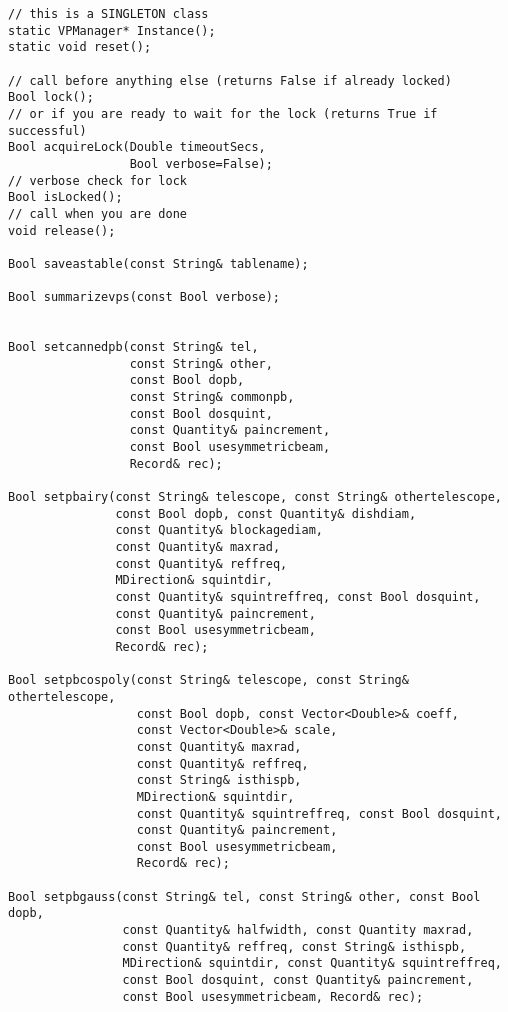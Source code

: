 \documentclass[12pt]{article}
\begin{document}
{\small
\begin{verbatim}
// this is a SINGLETON class
static VPManager* Instance();
static void reset();
 
// call before anything else (returns False if already locked)
Bool lock();
// or if you are ready to wait for the lock (returns True if successful)
Bool acquireLock(Double timeoutSecs, 
                 Bool verbose=False);
// verbose check for lock
Bool isLocked();
// call when you are done
void release();
     
Bool saveastable(const String& tablename);

Bool summarizevps(const Bool verbose);


Bool setcannedpb(const String& tel, 
                 const String& other, 
                 const Bool dopb,
                 const String& commonpb,
                 const Bool dosquint, 
                 const Quantity& paincrement, 
                 const Bool usesymmetricbeam,
                 Record& rec);

Bool setpbairy(const String& telescope, const String& othertelescope, 
               const Bool dopb, const Quantity& dishdiam, 
               const Quantity& blockagediam, 
               const Quantity& maxrad, 
               const Quantity& reffreq, 
               MDirection& squintdir, 
               const Quantity& squintreffreq, const Bool dosquint, 
               const Quantity& paincrement, 
               const Bool usesymmetricbeam,
               Record& rec);

Bool setpbcospoly(const String& telescope, const String& othertelescope,
                  const Bool dopb, const Vector<Double>& coeff,
                  const Vector<Double>& scale,
                  const Quantity& maxrad,
                  const Quantity& reffreq,
                  const String& isthispb,
                  MDirection& squintdir,
                  const Quantity& squintreffreq, const Bool dosquint,
                  const Quantity& paincrement,
                  const Bool usesymmetricbeam,
                  Record& rec);

Bool setpbgauss(const String& tel, const String& other, const Bool dopb,
                const Quantity& halfwidth, const Quantity maxrad, 
                const Quantity& reffreq, const String& isthispb, 
                MDirection& squintdir, const Quantity& squintreffreq,
                const Bool dosquint, const Quantity& paincrement, 
                const Bool usesymmetricbeam, Record& rec);


\end{verbatim}}
\end{document}
